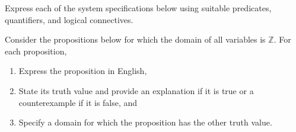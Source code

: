 \documentclass[addpoints]{exam}
\begin{document}
\begin{questions}

\question Express each of the system specifications below using suitable predicates, quantifiers, and logical connectives.

\question
  Consider the propositions below for which the domain of all variables is $\mathbb{Z}$. For each proposition,
  \begin{enumerate}
  \item Express the proposition in English,
  \item State its truth value and provide an explanation if it is true or a counterexample if it is false, and
  \item Specify a domain for which the proposition has the other truth value.
  \end{enumerate}


\end{questions}
\end{document}
